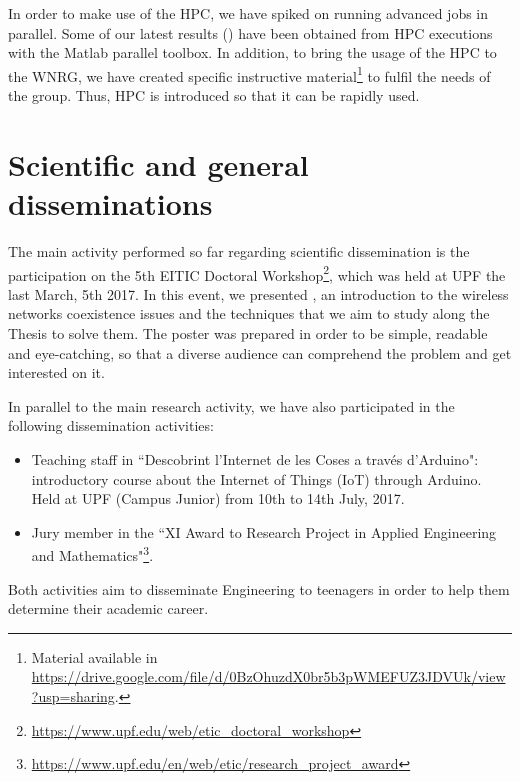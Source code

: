 \documentclass[12pt, a4paper,twoside]{article}
\begin{document}
	In order to make use of the HPC, we have spiked on running advanced jobs in parallel. Some of our latest results (\cite{wilhelmi2017implications}) have been obtained from HPC executions with the Matlab parallel toolbox. In addition, to bring the usage of the HPC to the WNRG, we have created specific instructive material\footnote{Material available in \url{https://drive.google.com/file/d/0BzOhuzdX0br5b3pWMEFUZ3JDVUk/view?usp=sharing}.} to fulfil the needs of the group. Thus, HPC is introduced so that it can be rapidly used.	
		
	\section{Scientific and general disseminations}
	\label{section:dissemination}			
	The main activity performed so far regarding scientific dissemination is the participation on the 5th EITIC Doctoral Workshop\footnote{\url{https://www.upf.edu/web/etic_doctoral_workshop}}, which was held at UPF the last March, 5th 2017. In this event, we presented \cite{wilhelmi2017improving}, an introduction to the wireless networks coexistence issues and the techniques that we aim to study along the Thesis to solve them. The poster was prepared in order to be simple, readable and eye-catching, so that a diverse audience can comprehend the problem and get interested on it.
	
	In parallel to the main research activity, we have also participated in the following dissemination activities:
	\begin{itemize}
		\item Teaching staff in ``Descobrint l'Internet de les Coses a través d'Arduino": introductory course about the Internet of Things (IoT) through Arduino. Held at UPF (Campus Junior) from 10th to 14th July, 2017.
		\item Jury member in the ``XI Award to Research Project in Applied Engineering and Mathematics"\footnote{\url{https://www.upf.edu/en/web/etic/research_project_award}}.
	\end{itemize}
	Both activities aim to disseminate Engineering to teenagers in order to help them determine their academic career.
	
\end{document}
